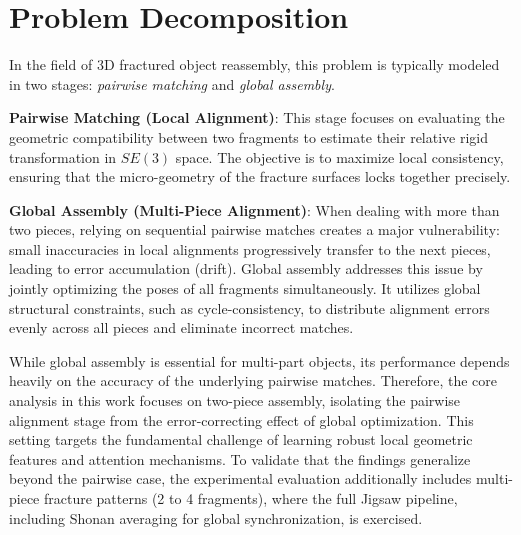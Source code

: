 \section{Problem Decomposition}

In the field of 3D fractured object reassembly, this problem is typically modeled in two stages: \textit{pairwise matching} and \textit{global assembly}. 

\textbf{Pairwise Matching (Local Alignment)}: This stage focuses on evaluating the geometric compatibility between two fragments to estimate their relative rigid transformation in \(SE(3)\) space. The objective is to maximize local consistency, ensuring that the micro-geometry of the fracture surfaces locks together precisely. 

\textbf{Global Assembly (Multi-Piece Alignment)}: When dealing with more than two pieces, relying on sequential pairwise matches creates a major vulnerability: small inaccuracies in local alignments progressively transfer to the next pieces, leading to error accumulation (drift). Global assembly addresses this issue by jointly optimizing the poses of all fragments simultaneously. It utilizes global structural constraints, such as cycle-consistency, to distribute alignment errors evenly across all pieces and eliminate incorrect matches.

While global assembly is essential for multi-part objects, its performance depends heavily on the accuracy of the underlying pairwise matches. Therefore, the core analysis in this work focuses on two-piece assembly, isolating the pairwise alignment stage from the error-correcting effect of global optimization. This setting targets the fundamental challenge of learning robust local geometric features and attention mechanisms. To validate that the findings generalize beyond the pairwise case, the experimental evaluation additionally includes multi-piece fracture patterns (2 to 4 fragments), where the full Jigsaw pipeline, including Shonan averaging for global synchronization, is exercised.
